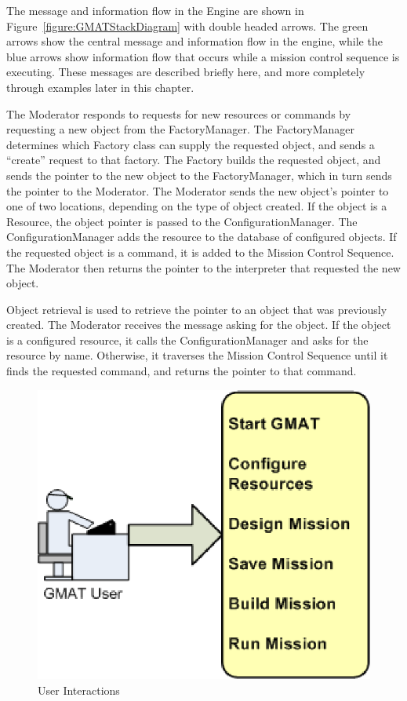 \noindent The message and information flow in the Engine are shown in
Figure~\ref{figure:GMATStackDiagram} with double headed arrows.  The green arrows show the central
message and information flow in the engine, while the blue arrows show information flow that occurs
while a mission control sequence is executing.  These messages are described briefly here, and more
completely through examples later in this chapter.

The Moderator responds to requests for new resources or commands by requesting a new object from the
FactoryManager.  The FactoryManager determines which Factory class can supply the requested object,
and sends a ``create'' request to that factory.  The Factory builds the requested object, and sends
the pointer to the new object to the FactoryManager, which in turn sends the pointer to the
Moderator.  The Moderator sends the new object's pointer to one of two locations, depending on the
type of object created.  If the object is a Resource, the object pointer is passed to the
ConfigurationManager.  The ConfigurationManager adds the resource to the database of configured
objects.  If the requested object is a command, it is added to the Mission Control Sequence.  The
Moderator then returns the pointer to the interpreter that requested the new object.

Object retrieval is used to retrieve the pointer to an object that was previously created.  The
Moderator receives the message asking for the object.  If the object is a configured resource, it
calls the ConfigurationManager and asks for the resource by name.  Otherwise, it traverses the
Mission Control Sequence until it finds the requested command, and returns the pointer to that
command.

\begin{figure}
\begin{center}
\includegraphics[scale=0.5]{Images/GMAT_UserPerspective.eps}
\caption{\label{figure:UserWorkFlow}User Interactions}
\end{center}
\end{figure}

